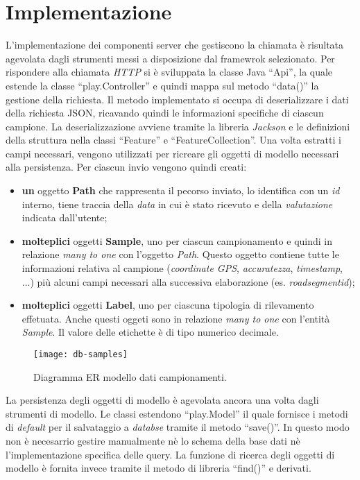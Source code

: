 \section{Implementazione}
L'implementazione dei componenti server che gestiscono la chiamata è risultata agevolata dagli strumenti messi a disposizione dal framewrok selezionato. Per rispondere alla chiamata \emph{HTTP} si è sviluppata la classe Java ``Api'', la quale estende la classe ``play.Controller'' e quindi mappa sul metodo ``data()'' la gestione della richiesta.
Il metodo implementato si occupa di deserializzare i dati della richiesta JSON, ricavando quindi le informazioni specifiche di ciascun campione. La deserializzazione avviene tramite la libreria \emph{Jackson} e le definizioni della struttura nella classi ``Feature'' e ``FeatureCollection''.
Una volta estratti i campi necessari, vengono utilizzati per ricreare gli oggetti di modello necessari alla persistenza. Per ciascun invio vengono quindi creati:
\begin{itemize}
    \item \textbf{un} oggetto \textbf{Path} che rappresenta il pecorso inviato, lo identifica con un \emph{id} interno, tiene traccia della \emph{data} in cui è stato ricevuto e della \emph{valutazione} indicata dall'utente;
    \item \textbf{molteplici} oggetti \textbf{Sample}, uno per ciascun campionamento e quindi in relazione \emph{many to one} con l'oggetto \emph{Path}. Questo oggetto contiene tutte le informazioni relativa al campione (\emph{coordinate GPS}, \emph{accuratezza}, \emph{timestamp}, ...) più alcuni campi necessari alla successiva elaborazione (es. \emph{roadsegment\textunderscore id});
    \item \textbf{molteplici} oggetti \textbf{Label}, uno per ciascuna tipologia di rilevamento effetuata. Anche questi oggeti sono in relazione \emph{many to one} con l'entità \emph{Sample}. Il valore delle etichette è di tipo numerico decimale.
\end{itemize}

\begin{figure}[ht]
  \centering
  \texttt{[image: db-samples]}
  \caption{\footnotesize{Diagramma ER modello dati campionamenti.}}
  \label{fig:db-samples}
\end{figure}
La persistenza degli oggetti di modello è agevolata ancora una volta dagli strumenti di modello. Le classi estendono ``play.Model'' il quale fornisce i metodi di \emph{default} per il salvataggio a \emph{databse} tramite il metodo ``save()''. In questo modo non è necesarrio gestire manualmente nè lo schema della base dati nè l'implementazione specifica delle query. La funzione di ricerca degli oggetti di modello è fornita invece tramite il metodo di libreria ``find()'' e derivati.


